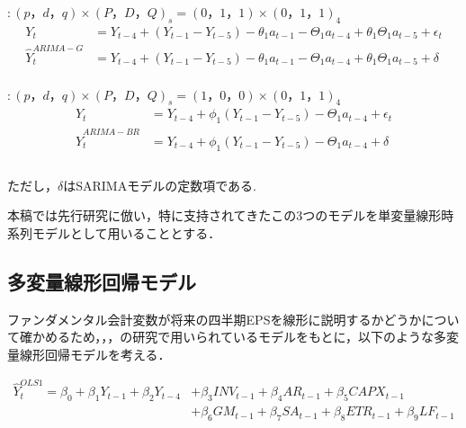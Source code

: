 \documentclass[a4paper，11pt]{jsarticle}
\begin{document}
\cite{griffin1977time} $: (p，d，q) \times (P，D，Q)_s = (0，1，1) \times (0，1，1)_4$
\begin{equation}
  \begin{split}
    Y_t &= Y_{t-4} + (Y_{t-1} - Y_{t-5}) - \theta_1a_{t-1} - \Theta_1a_{t-4} + \theta_1\Theta_1a_{t-5} + \epsilon_t \\
    \hat{Y}_t^{ARIMA-G} &= Y_{t-4} + (Y_{t-1} - Y_{t-5}) - \theta_1a_{t-1} - \Theta_1a_{t-4} + \theta_1\Theta_1a_{t-5} + \delta \\
  \end{split}
\end{equation}

\cite*{brown1979univariate} $: (p，d，q) \times (P，D，Q)_s = (1，0，0) \times (0，1，1)_4$
\begin{equation}
  \begin{split}    
    Y_t &= Y_{t-4} + \phi_1(Y_{t-1}-Y_{t-5}) - \Theta_1a_{t-4} + \epsilon_t \\
    \hat{Y}_t^{ARIMA-BR} &= Y_{t-4} + \phi_1(Y_{t-1}-Y_{t-5}) - \Theta_1a_{t-4} + \delta \\
    \\
  \end{split}
\end{equation}

ただし，$\delta$はSARIMAモデルの定数項である.

\noindent
本稿では先行研究に倣い，特に支持されてきたこの3つのモデルを単変量線形時系列モデルとして用いることとする．

\subsection{多変量線形回帰モデル}

ファンダメンタル会計変数が将来の四半期EPSを線形に説明するかどうかについて確かめるため，\cite*{lev1993fundamental}，\cite*{abarbanell1997fundamental}，\cite*{lorek1996multivariate}の研究で用いられているモデルをもとに，以下のような多変量線形回帰モデルを考える．

\begin{equation}
  \begin{split}
    \label{eq:ols1}
    \hat{Y}_t^{OLS1} = \beta_0 + \beta_1Y_{t-1} + \beta_2Y_{t-4} 
    &+ \beta_3INV_{t-1} + \beta_4AR_{t-1} + \beta_5CAPX_{t-1} \\
    &+ \beta_6GM_{t-1} + \beta_7SA_{t-1} + \beta_8ETR_{t-1} + \beta_9LF_{t-1} \\
  \end{split}
\end{equation}
\end{document}
